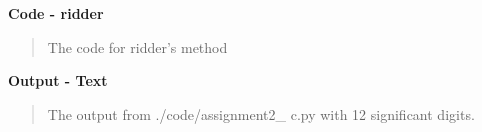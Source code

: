 \newpage
\textbf{Code - ridder}
\begin{quote}
\hspace*{-0.6cm}The code for ridder's method

\end{quote}

\textbf{Output - Text}
\begin{quote}
The output from \textsf{./code/assignment2\_ c.py} with 12 significant digits.

\end{quote}
\newpage








